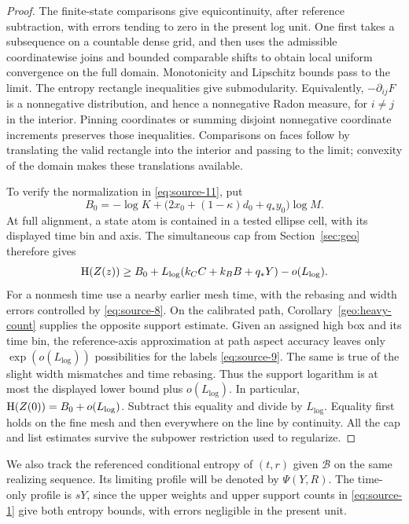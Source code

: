 \begin{proof}
The finite-state comparisons give equicontinuity, after reference
subtraction, with errors tending to zero in the present log unit.
One first takes a subsequence on a countable dense grid, and then
uses the admissible coordinatewise joins and bounded comparable
shifts to obtain local uniform convergence on the full domain.
Monotonicity and Lipschitz bounds pass to the limit.  The entropy
rectangle inequalities give submodularity.  Equivalently,
$-\partial_{ij}F$ is a nonnegative distribution, and hence a
nonnegative Radon measure, for $i\ne j$ in the interior.
Pinning coordinates or summing disjoint nonnegative coordinate
increments preserves those inequalities.  Comparisons on faces
follow by translating the valid rectangle into the interior and
passing to the limit; convexity of the domain makes these
translations available.

To verify the normalization in \eqref{eq:source-11}, put
\[
B_0=-\log K+
 \bigl(2x_0+(1-\kappa)d_0+q_*y_0\bigr)\log M.
\]
At full alignment, a state atom is contained in a tested ellipse
cell, with its displayed time bin and axis.  The simultaneous cap
from Section~\ref{sec:geo} therefore gives
\[
\operatorname{H}(Z(z))\geq
B_0+L_{\log}(k_C C+k_B B+q_*Y)-o(L_{\log}).
\]
For a nonmesh time use a nearby earlier mesh time, with the rebasing
and width errors controlled by \eqref{eq:source-8}.
On the calibrated path, Corollary~\ref{geo:heavy-count} supplies the
opposite support estimate.  Given an assigned high box and its time
bin, the reference-axis approximation at path aspect accuracy leaves
only $\exp(o(L_{\log}))$ possibilities for the labels
\eqref{eq:source-9}.  The same is true of the slight width
mismatches and time rebasing.  Thus the support logarithm is at most
the displayed lower bound plus $o(L_{\log})$.  In particular,
$\operatorname{H}(Z(0))=B_0+o(L_{\log})$.  Subtract this equality and divide by
$L_{\log}$.  Equality first holds on the fine mesh and then
everywhere on the line by continuity.  All the cap and list
estimates survive the subpower restriction used to regularize.
\end{proof}

We also track the referenced conditional entropy of $(t,r)$ given
$\mathcal B$ on the same realizing sequence.  Its limiting profile
will be denoted by $\Psi(Y,R)$.  The time-only profile is $sY$, since
the upper weights and upper support counts in \eqref{eq:source-1}
give both entropy bounds, with errors negligible in the present
unit.

